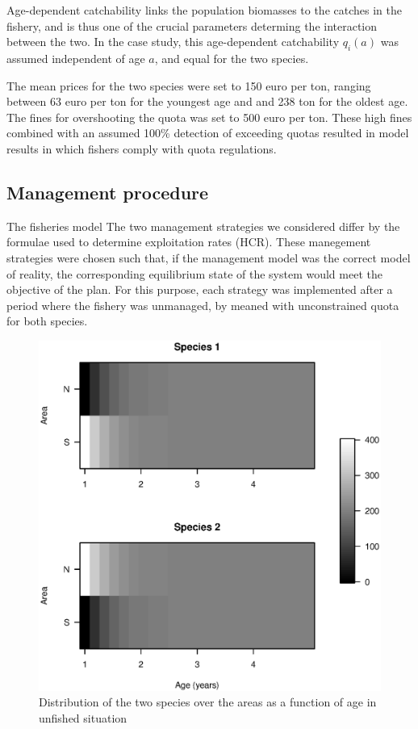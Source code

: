 \documentclass[12pt,oneline,a4paper,numbib]{ouparticle}
\numberwithin{equation}{subsection} %
\begin{document}
Age-dependent catchability links the population biomasses to the catches in the fishery, and is thus one of the crucial parameters determing the interaction between the two. In the case study, this age-dependent catchability $q_i (a)$ was assumed independent of age $a$, and equal for the two species.

The mean prices for the two species were set to 150 euro per ton, ranging between 63 euro per ton for the youngest age and and 238 ton for the oldest age. The fines for overshooting the quota was set  to 500 euro per ton. These high fines combined with an assumed 100\% detection of exceeding quotas resulted in model results in which fishers comply with quota regulations.

\subsection{Management procedure}
\label{sec2.3}
The fisheries model 
The two management strategies we considered differ by the formulae used to determine exploitation rates (HCR). These manegement strategies were chosen such that, if  the  management  model  was  the  correct  model  of  reality,  the corresponding  equilibrium  state  of  the  system  would  meet  the  objective  of  the  plan. For this purpose, each strategy was implemented after a period where the fishery was unmanaged, by meaned with unconstrained quota for both species.

\begin{figure}[!ht]
\centering
\label{f:distributions}
\includegraphics[width=.69\textwidth]{Figures/distributions.eps} 
\caption{Distribution of the two species over the areas as a function of age in unfished situation}
\end{figure}
\end{document}
